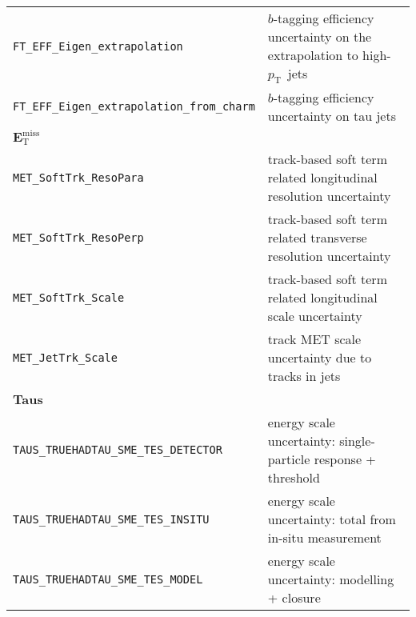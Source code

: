 {\begin{xltabular}{\textwidth}{XL}
  \texttt{FT\_EFF\_Eigen\_extrapolation} & $b$-tagging efficiency uncertainty on the extrapolation to high-$p_{\mathrm{T}}$\ jets \\
  \texttt{FT\_EFF\_Eigen\_extrapolation\_from\_charm} & $b$-tagging efficiency uncertainty on tau jets \\
  {\bfseries $\bm{E}_{\mathrm{T}}^{\text{miss}}$}&\\
  \texttt{MET\_SoftTrk\_ResoPara} & track-based soft term related longitudinal resolution uncertainty \\
  \texttt{MET\_SoftTrk\_ResoPerp} &  track-based soft term related transverse resolution uncertainty \\
  \texttt{MET\_SoftTrk\_Scale} & track-based soft term related longitudinal scale uncertainty \\
  \texttt{MET\_JetTrk\_Scale} & track MET scale uncertainty due to tracks in jets \\
  {\bfseries Taus}&\\
  \texttt{TAUS\_TRUEHADTAU\_SME\_TES\_DETECTOR} & energy scale uncertainty: single-particle response + threshold \\
  \texttt{TAUS\_TRUEHADTAU\_SME\_TES\_INSITU} & energy scale uncertainty: total from in-situ measurement \\
  \texttt{TAUS\_TRUEHADTAU\_SME\_TES\_MODEL} & energy scale uncertainty: modelling + closure \\
\end{xltabular}}
